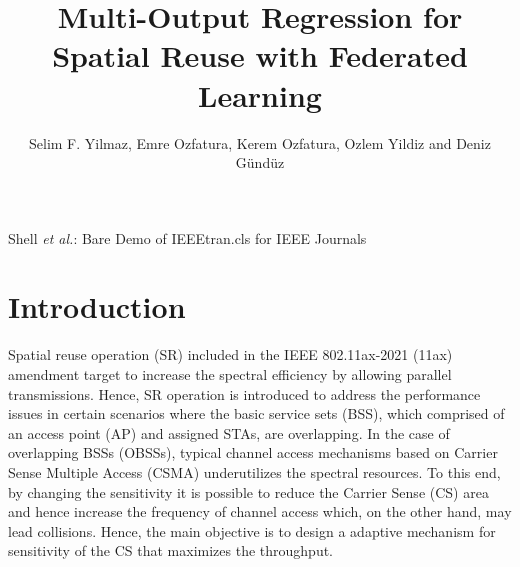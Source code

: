 \documentclass[journal]{IEEEtran}
\begin{document}
\title{Multi-Output Regression for Spatial Reuse with Federated Learning}

\author{Selim F. Yilmaz, Emre Ozfatura, Kerem Ozfatura, Ozlem Yildiz and Deniz G\"{u}nd\"{u}z}

%
{Shell \MakeLowercase{\textit{et al.}}: Bare Demo of IEEEtran.cls for IEEE Journals}

\maketitle

\begin{abstract}

\end{abstract}

\begin{IEEEkeywords}
\end{IEEEkeywords}

\IEEEpeerreviewmaketitle



\section{Introduction}
Spatial reuse operation (SR) included in the IEEE 802.11ax-2021 (11ax) amendment \cite{11ax} target to increase the spectral efficiency by allowing parallel transmissions. Hence, SR operation is introduced to address the performance issues in certain scenarios where the basic service sets (BSS), which comprised of an access point (AP) and assigned STAs, are overlapping. In the case of overlapping BSSs (OBSSs),  typical channel access mechanisms based on Carrier Sense Multiple Access (CSMA) underutilizes the spectral resources. To this end, by changing the sensitivity it is possible to reduce the Carrier Sense (CS) area and hence increase the frequency of channel access which, on the other hand, may lead collisions. Hence, the main objective is to design a adaptive mechanism for sensitivity of the CS that maximizes the throughput.
\end{document}
